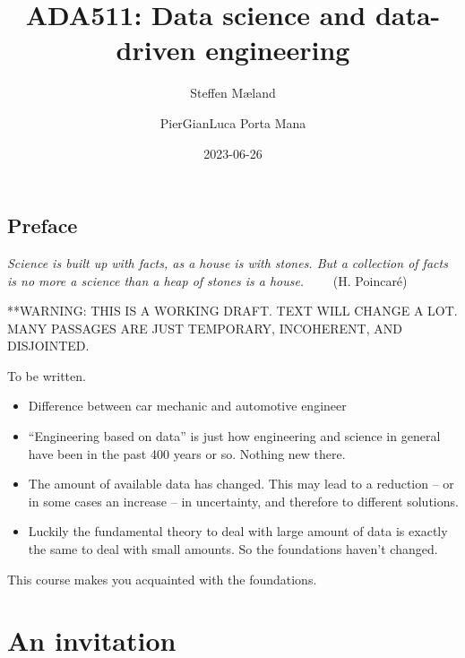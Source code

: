 \documentclass[
  a4paper,
  DIV=11,
  numbers=noendperiod,
  oneside]{scrreprt}
\title{ADA511: Data science and data-driven engineering}
\author{Steffen Mæland \and PierGianLuca Porta Mana}
\date{2023-06-26}
\renewcommand*\contentsname{Table of contents}
\newcommand\contentsname{Table of contents}
\begin{document}
\maketitle
\ifdefined\Shaded\renewenvironment{Shaded}{\begin{tcolorbox}[interior hidden, enhanced, breakable, sharp corners, boxrule=0pt, frame hidden, borderline west={3pt}{0pt}{shadecolor}]}{\end{tcolorbox}}\fi

\renewcommand*\contentsname{Table of contents}
{
\hypersetup{linkcolor=}
\setcounter{tocdepth}{2}
\tableofcontents
}

\hypertarget{preface}{%
\chapter*{Preface}\label{preface}}


\hfill\break
\hfill\break
\hfill\break
\hfill\break
\hfill\break
\hfill\break

\emph{Science is built up with facts, as a house is with stones. But a
collection of facts is no more a science than a heap of stones is a
house.} ~~~~{(H. Poincaré)}

**WARNING: THIS IS A WORKING DRAFT. TEXT WILL CHANGE A LOT. MANY
PASSAGES ARE JUST TEMPORARY, INCOHERENT, AND DISJOINTED.

To be written.

\begin{itemize}
\item
  Difference between car mechanic and automotive engineer
\item
  ``Engineering based on data'' is just how engineering and science in
  general have been in the past 400 years or so. Nothing new there.
\item
  The amount of available data has changed. This may lead to a reduction
  -- or in some cases an increase -- in uncertainty, and therefore to
  different solutions.
\item
  Luckily the fundamental theory to deal with large amount of data is
  exactly the same to deal with small amounts. So the foundations
  haven't changed.
\end{itemize}

This course makes you acquainted with the foundations.

\part{An invitation}
\end{document}

